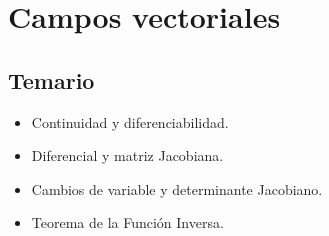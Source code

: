 \documentclass[11pt]{book}
\theoremstyle{definicion}
\theoremstyle{teorema}
\theoremstyle{ejemplo}
\begin{document}






\chapter{Campos vectoriales}

\section{Temario}

\begin{itemize}
    \item Continuidad y diferenciabilidad. 
    \item Diferencial y matriz Jacobiana.
    \item Cambios de variable y determinante Jacobiano.
    \item Teorema de la Función Inversa.
\end{itemize}
\end{document}

